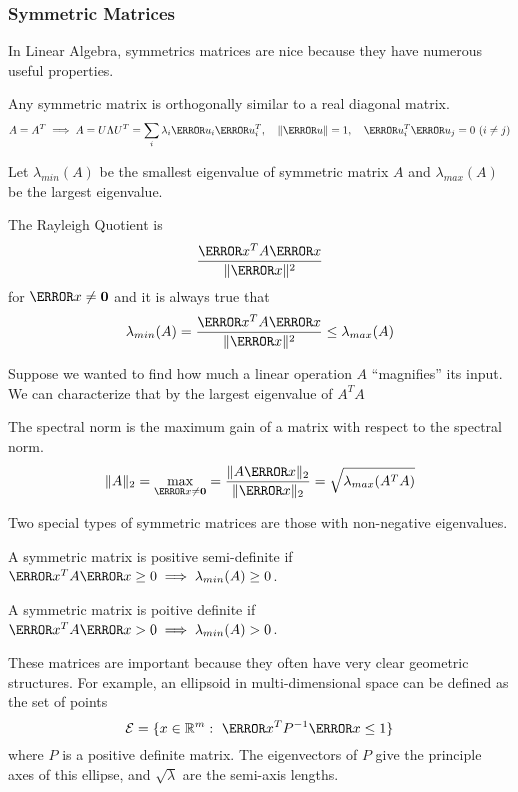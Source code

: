 \subsubsection{Symmetric Matrices}
In Linear Algebra, symmetrics matrices are nice because they have numerous useful properties.
\begin{theorem}
  Any symmetric matrix is orthogonally similar to a real diagonal matrix.
  \[
	A = A^T \implies A = U \Lambda U^T = \sum_i \lambda_i \V{u}_i\V{u}_i^T,\quad \|\V{u}\| = 1, \quad \V{u}_i^T\V{u}_j = 0 \ (i \ne j)
  \]
  \label{thm:spectral}
\end{theorem}
Let $\lambda_{min}(A)$ be the smallest eigenvalue of symmetric matrix $A$ and $\lambda_{max}(A)$ be the largest eigenvalue.
\begin{definition}
  The Rayleigh Quotient is \[
	\frac{\V{x}^TA\V{x}}{\|\V{x}\|^2}
  \] for $\V{x} \ne \bs{0}$ and it is always true that
  \[
	\lambda_{min}(A) = \frac{\V{x}^TA\V{x}}{\|\V{x}\|^2} \leq \lambda_{max}(A)
  \]
  \label{defn:rayleigh-quotient}
\end{definition}
Suppose we wanted to find how much a linear operation $A$ ``magnifies'' its input. We can characterize that by the largest eigenvalue of $A^T A$
\begin{definition}
  The spectral norm is the maximum gain of a matrix with respect to the spectral norm.
  \[
	\|A\|_2 = \max_{\V{x} \ne \bs{0}} = \frac{\|A\V{x}\|_2}{\|\V{x}\|_2} = \sqrt{\lambda_{max}(A^T A)}
  \]
  \label{defn:spectral-norm}
\end{definition}
Two special types of symmetric matrices are those with non-negative eigenvalues.
\begin{definition}
  A symmetric matrix is positive semi-definite if $\V{x}^TA\V{x} \geq 0 \implies \lambda_{min}(A) \geq 0$.
  \label{defn:psd-matrix}
\end{definition}
\begin{definition}
  A symmetric matrix is poitive definite if $\V{x}^TA\V{x} > 0 \implies \lambda_{min}(A) > 0$.
  \label{defn:pd-matrix}
\end{definition}
These matrices are important because they often have very clear geometric structures.
For example, an ellipsoid in multi-dimensional space can be defined as the set of points
\[
  \mathcal{E} = \{ x\in\mathbb{R}^m : \ \V{x}^T P^{-1} \V{x} \leq 1 \} 
\]
where $P$ is a positive definite matrix.
The eigenvectors of $P$ give the principle axes of this ellipse, and $\sqrt{\lambda}$ are the semi-axis lengths.


